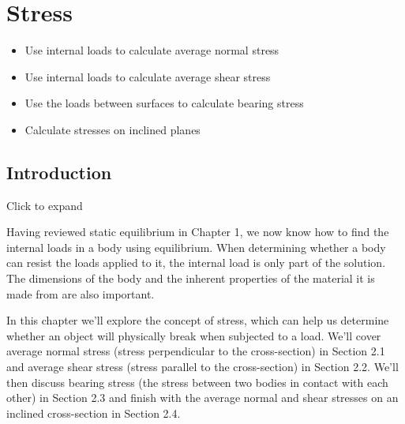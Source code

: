 \documentclass[
  letterpaper,
  DIV=11,
  numbers=noendperiod]{scrreprt}
\providecommand{\tightlist}{%
  \setlength{\itemsep}{0pt}\setlength{\parskip}{0pt}}\usepackage{longtable,booktabs,array}
\begin{document}

\chapter{Stress}\label{sec-stress}

\begin{tcolorbox}[enhanced jigsaw, colback=white, colframe=quarto-callout-note-color-frame, leftrule=.75mm, opacitybacktitle=0.6, colbacktitle=quarto-callout-note-color!10!white, arc=.35mm, bottomrule=.15mm, breakable, title={Learning Objectives}, left=2mm, titlerule=0mm, toptitle=1mm, toprule=.15mm, opacityback=0, rightrule=.15mm, coltitle=black, bottomtitle=1mm]

\begin{itemize}
\tightlist
\item
  Use internal loads to calculate average normal stress
\item
  Use internal loads to calculate average shear stress
\item
  Use the loads between surfaces to calculate bearing stress
\item
  Calculate stresses on inclined planes
\end{itemize}

\end{tcolorbox}

\section{Introduction}\label{introduction-2}

Click to expand

Having reviewed static equilibrium in Chapter 1, we now know how to find
the internal loads in a body using equilibrium. When determining whether
a body can resist the loads applied to it, the internal load is only
part of the solution. The dimensions of the body and the inherent
properties of the material it is made from are also important.

In this chapter we'll explore the concept of stress, which can help us
determine whether an object will physically break when subjected to a
load. We'll cover average normal stress (stress perpendicular to the
cross-section) in Section 2.1 and average shear stress (stress parallel
to the cross-section) in Section 2.2. We'll then discuss bearing stress
(the stress between two bodies in contact with each other) in Section
2.3 and finish with the average normal and shear stresses on an inclined
cross-section in Section 2.4.
\end{document}
